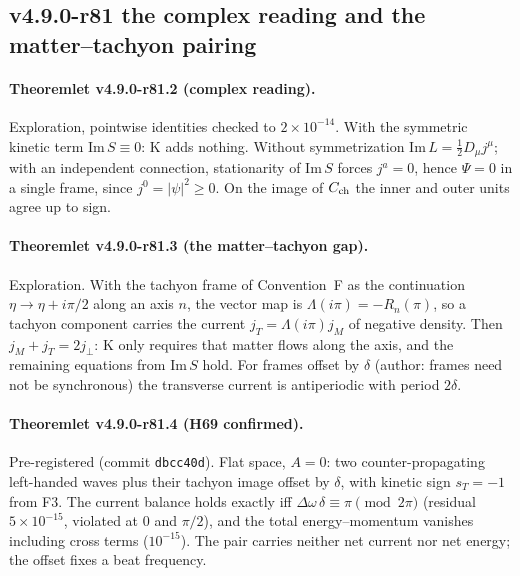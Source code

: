 \subsection*{v4.9.0-r81 the complex reading and the matter--tachyon pairing}
\label{subsec:v490-r81-pairing}

\paragraph{Theoremlet v4.9.0-r81.2 (complex reading).}
Exploration, pointwise identities checked to \(2\times10^{-14}\).  With the symmetric kinetic term \(\mathrm{Im}\,S\equiv0\): K adds nothing.  Without
symmetrization \(\mathrm{Im}\,L=\tfrac12D_\mu j^\mu\); with an independent connection, stationarity of \(\mathrm{Im}\,S\) forces \(j^a=0\), hence \(\Psi=0\)
in a single frame, since \(j^0=|\psi|^2\ge0\).  On the image of \(C_{\rm ch}\) the inner and outer units agree up to sign.

\paragraph{Theoremlet v4.9.0-r81.3 (the matter--tachyon gap).}
Exploration.  With the tachyon frame of Convention~F as the continuation \(\eta\to\eta+i\pi/2\) along an axis \(n\), the vector map is
\(\Lambda(i\pi)=-R_n(\pi)\), so a tachyon component carries the current \(j_T=\Lambda(i\pi)j_M\) of negative density.  Then \(j_M+j_T=2j_\perp\):
K only requires that matter flows along the axis, and the remaining equations from \(\mathrm{Im}\,S\) hold.  For frames offset by \(\delta\)
(author: frames need not be synchronous) the transverse current is antiperiodic with period \(2\delta\).

\paragraph{Theoremlet v4.9.0-r81.4 (H69 confirmed).}
Pre-registered (commit \texttt{dbcc40d}).  Flat space, \(A=0\): two counter-propagating left-handed waves plus their tachyon image offset by
\(\delta\), with kinetic sign \(s_T=-1\) from F3.  The current balance holds exactly iff \(\Delta\omega\,\delta\equiv\pi\pmod{2\pi}\) (residual
\(5\times10^{-15}\), violated at \(0\) and \(\pi/2\)), and the total energy--momentum vanishes including cross terms (\(10^{-15}\)).  The pair
carries neither net current nor net energy; the offset fixes a beat frequency.

